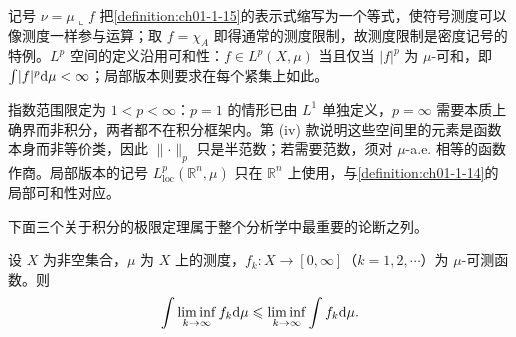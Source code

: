 \documentclass[../../main.tex]{subfiles}%
\begin{document}
\begin{remark}\label{remark:ch01-1-3-记号}
记号 $\nu=\mu\llcorner f$ 把\cref{definition:ch01-1-15}的表示式缩写为一个等式，使符号测度可以像测度一样参与运算；取 $f=\chi_{A}$ 即得通常的测度限制，故测度限制是密度记号的特例。$L^{p}$ 空间的定义沿用可和性：$f\in L^{p}(X,\mu)$ 当且仅当 $\lvert f\rvert^{p}$ 为 $\mu$-可和，即 $\int\lvert f\rvert^{p}\mathrm{d}\mu<\infty$；局部版本则要求在每个紧集上如此。%

指数范围限定为 $1<p<\infty$：$p=1$ 的情形已由 $L^1$ 单独定义，$p=\infty$ 需要本质上确界而非积分，两者都不在积分框架内。第 (iv) 款说明这些空间里的元素是函数本身而非等价类，因此 $\lVert\cdot\rVert_{p}$ 只是半范数；若需要范数，须对 $\mu$-a.e. 相等的函数作商。局部版本的记号 $L^{p}_{\mathrm{loc}}(\mathbb{R}^n,\mu)$ 只在 $\mathbb{R}^n$ 上使用，与\cref{definition:ch01-1-14}的局部可和性对应。%
\end{remark}

下面三个关于积分的极限定理属于整个分析学中最重要的论断之列。

\begin{theorem}[Fatou 引理]\label{theorem:ch01-1-17}
设 $X$ 为非空集合，$\mu$ 为 $X$ 上的测度，$f_k:X\to[0,\infty]$（$k=1,2,\cdots$）为 $\mu$-可测函数。则
\begin{align}
\int\liminf_{k\to\infty}f_k\mathrm{d}\mu\leqslant\liminf_{k\to\infty}\int f_k\mathrm{d}\mu .\label{align:ch01-1-17-fatou}
\end{align}
\end{theorem}
\end{document}
